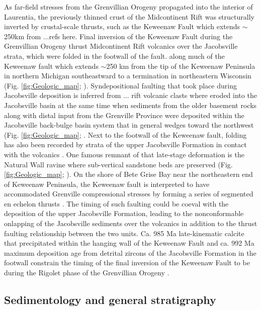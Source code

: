 \documentclass[draft]{agujournal2019}
\begin{document}
As far-field stresses from the Grenvillian Orogeny propagated into the interior of Laurentia, the previously thinned crust of the Midcontinent Rift was structurally inverted by crustal-scale thrusts, such as the Keweenaw Fault which extends $\sim$250km from ...refs here. Final inversion of the Keweenaw Fault during the Grenvillian Orogeny thrust Midcontinent Rift volcanics over the Jacobsville strata, which were folded in the footwall of the fault.  along much of the Keweenaw fault which extends $\sim$250 km from the tip of the Keweenaw Peninsula in northern Michigan southeastward to a termination in northeastern Wisconsin (Fig. \ref{fig:Geologic_map}; ). Syndepositional faulting that took place during Jacobsville deposition is inferred from ... rift volcanic clasts where eroded into the Jacobsville basin at the same time when sediments from the older basement rocks along with distal input from the Grenville Province were deposited within the Jacobsville back-bulge basin system that in general wedges toward the northwest (Fig. \ref{fig:Geologic_map}; \cite{Hedgman2014a, Hodgin2022a}. Next to the footwall of the Keweenaw fault, folding has also been recorded by strata of the upper Jacobsville Formation in contact with the volcanics \cite{Cannon1993a}. One famous remnant of that late-stage deformation is the Natural Wall ravine where sub-vertical sandstone beds are preserved (Fig. \ref{fig:Geologic_map}; \cite{Hamblin1958a}). On the shore of Bete Grise Bay near the northeastern end of Keweenaw Peninsula, the Keweenaw fault is interpreted to have accommodated Grenville compressional stresses by forming a series of segmented en echelon thrusts \cite{Tyrrell2019a}. The timing of such faulting could be coeval with the deposition of the upper Jacobsville Formation, leading to the nonconformable onlapping of the Jacobsville sediments over the volcanics in addition to the thrust faulting relationship between the two units. Ca. 985 Ma late-kinematic calcite that precipitated within the hanging wall of the Keweenaw Fault and ca. 992 Ma maximum deposition age from detrital zircons of the Jacobsville Formation in the footwall constrain the timing of the final inversion of the Keweenaw Fault to be during the Rigolet phase of the Grenvillian Orogeny \cite{Hodgin2022a}. 

\subsection{Sedimentology and general stratigraphy}
\end{document}
